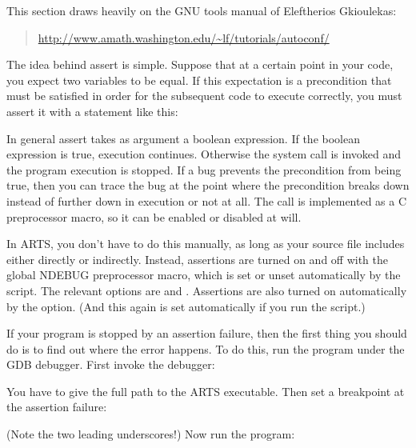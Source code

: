 This section draws heavily on the GNU tools manual of Eleftherios
Gkioulekas:
\begin{quote}
{\footnotesize
\url{http://www.amath.washington.edu/~lf/tutorials/autoconf/}}
\end{quote}

The idea behind assert is simple. Suppose that at a certain point in
your code, you expect two variables to be equal.  If this expectation
is a precondition that must be satisfied in order for the subsequent
code to execute correctly, you must assert it with a statement like
this:
\begin{quote}
\end{quote}

In general assert takes as argument a boolean expression. If the
boolean expression is true, execution continues. Otherwise the
 system call is invoked and the program execution is
stopped. If a bug prevents the precondition from being true, then you
can trace the bug at the point where the precondition breaks down
instead of further down in execution or not at all.  The  call
is implemented as a C preprocessor macro, so it can be enabled or
disabled at will. 

In ARTS, you don't have to do this manually, as long as your source
file includes  either directly or indirectly.
Instead, assertions are turned on and off with the global NDEBUG
preprocessor macro, which is set or unset automatically by the
 script. The relevant 
options are  and
. Assertions are also turned on
automatically by the  option. (And
this again is set automatically if you run the 
script.)

If your program is stopped by an assertion failure, then the first
thing you should do is to find out where the error happens. To do
this, run the program under the GDB debugger. First invoke
the debugger:
\begin{quote}
\end{quote}
You have to give the full path to the ARTS executable.  Then set a
breakpoint at the assertion failure:
\begin{quote}
\end{quote}
(Note the two leading underscores!) Now run the program: 
\begin{quote}
\end{quote}

